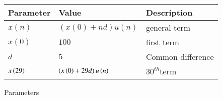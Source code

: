 \setlength{\arrayrulewidth}{0.3mm}
\setlength{\tabcolsep}{15pt}
\renewcommand{\arraystretch}{1.5}



\begin{tabular}{ |p{1cm}|p{2cm}|p{2 cm}| }
\hline
Parameter & Value & Description\\
\hline
$x(n)$ & $(x(0)+nd)u(n)$ & general term \\ \hline
$x(0)$ & $100$ & first term\\ \hline
$d$ & $5$ & Common difference\\ \hline
$x\left(29\right)$ & $\left(x\left(0\right) + 29d\right)u\left(n\right)$ & $30^{th}$term\\ \hline 

\end{tabular}
\caption{Parameters}
\label{tab:11.9.2.17.1}
